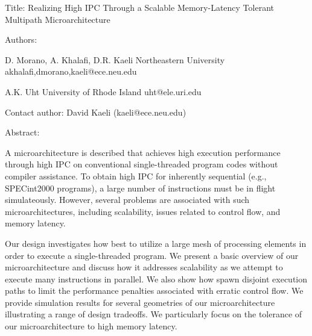 Title: Realizing High IPC Through a Scalable Memory-Latency Tolerant
Multipath Microarchitecture

Authors:

D. Morano, A. Khalafi, D.R. Kaeli
Northeastern University
akhalafi,dmorano,kaeli@ece.neu.edu
   
A.K. Uht 
University of Rhode Island
uht@ele.uri.edu

Contact author: David Kaeli (kaeli@ece.neu.edu)

Abstract:

A microarchitecture is described that achieves high execution
performance through high IPC on conventional single-threaded program
codes without compiler assistance.  To obtain high IPC 
for inherently sequential (e.g., SPECint2000 programs),
a large number of instructions must be in flight simulateously.   
However, several problems are associated with
such microarchitectures, including scalability, issues related to
control flow, and memory latency.

Our design investigates how best to utilize a large mesh of processing
elements in order to execute a single-threaded program.  
We present a basic overview of our microarchitecture and discuss how it
addresses scalability as we attempt to execute many instructions in
parallel.  We also show how spawn disjoint execution 
paths to limit the
performance penalties associated with erratic control flow.  We provide
simulation results for several geometries of our microarchitecture
illustrating a range of design tradeoffs.  We particularly focus on 
the tolerance of our microarchitecture to high memory latency.

